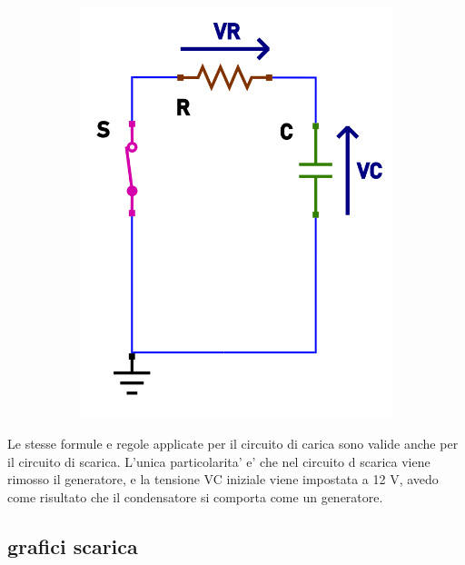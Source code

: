 \documentclass[12pt]{article}
\begin{document}
\begin{figure}[h!]
\begin{subfigure}[b]{0.347\linewidth}
    \includegraphics[width=\linewidth]{data/scarica-tensioni.png}
  \end{subfigure}
\end{figure}

Le stesse formule e regole applicate per il circuito di carica sono valide anche per il circuito di scarica. L'unica particolarita' e' che nel circuito d scarica viene rimosso il generatore, e la tensione VC iniziale viene impostata a 12 V, avedo come risultato che il condensatore si comporta come un generatore.

\subsection*{grafici scarica}
\end{document}
